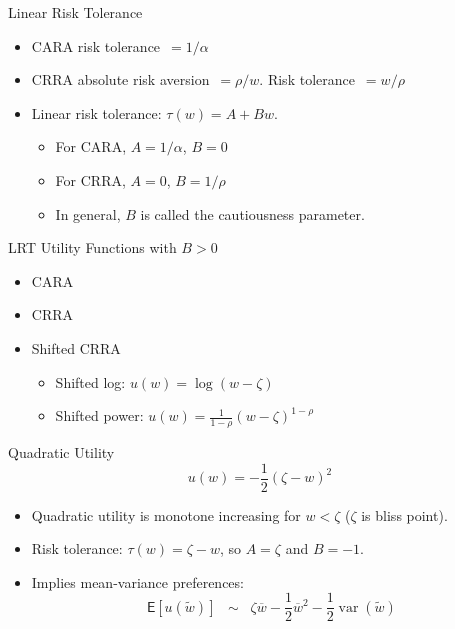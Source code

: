 \documentclass[10pt]{beamer}
\DeclareMathOperator{\var}{var}
\newcommand{\bi}{\begin{itemize}}
\newcommand{\ei}{\end{itemize}}
\newcommand{\im}{\item}
\newcommand{\mye}{\ensuremath{\mathsf{E}}}
\begin{document}
\begin{frame}{Linear Risk Tolerance}
  \bi
  \im CARA risk tolerance $\,= 1/\alpha$
  \im CRRA absolute risk aversion $\,= \rho/w$.  Risk tolerance $\,= w/\rho$
  \im Linear risk tolerance: $\tau(w) = A + B w$.
  \bi
  \im For CARA, $A=1/\alpha$, $B=0$
  \im For CRRA, $A=0$, $B = 1/\rho$
  \im In general, $B$ is called the cautiousness parameter.
  \ei
  \ei
  \end{frame}
  
  \begin{frame}{LRT Utility Functions with $B>0$}
  \bi
  \im CARA
  \im CRRA
  \im Shifted CRRA
  \bi
  \im Shifted log: $u(w) = \log (w-\zeta)$
  \im Shifted power: $u(w) = \frac{1}{1-\rho}(w-\zeta)^{1-\rho}$
  \ei
  \ei
  \end{frame}
  
  \begin{frame}{Quadratic Utility}
   $$u(w) = -\frac{1 }{2}\left(\zeta-w\right)^2$$ 
  \bi
  \im Quadratic utility is monotone increasing for $w<\zeta$ ($\zeta$ is bliss point).
  \im Risk tolerance: $\tau(w) = \zeta-w$, so $A=\zeta$ and $B=-1$.   
  \im Implies mean-variance preferences:
  $$\mye[u(\tilde{w})] \;\;\sim  \;\;\zeta \overline{w} - \frac{1}{2}\overline{w}^2 - \frac{1}{2}\var(\widetilde{w})$$
  \ei
  \end{frame}
  
\end{document}
